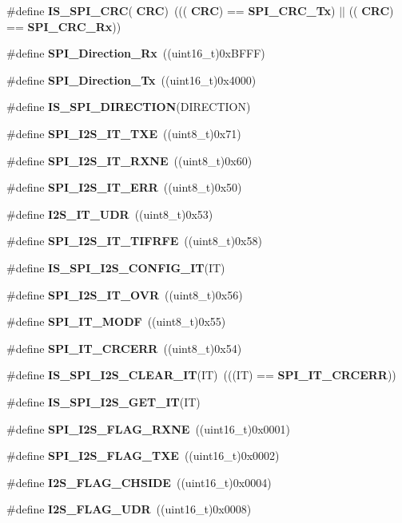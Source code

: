 \begin{DoxyCompactItemize}
\#define \textbf{ I\+S\+\_\+\+S\+P\+I\+\_\+\+C\+RC}(\textbf{ C\+RC})~(((\textbf{ C\+RC}) == \textbf{ S\+P\+I\+\_\+\+C\+R\+C\+\_\+\+Tx}) $\vert$$\vert$ ((\textbf{ C\+RC}) == \textbf{ S\+P\+I\+\_\+\+C\+R\+C\+\_\+\+Rx}))
\item 
\#define \textbf{ S\+P\+I\+\_\+\+Direction\+\_\+\+Rx}~((uint16\+\_\+t)0x\+B\+F\+F\+F)
\item 
\#define \textbf{ S\+P\+I\+\_\+\+Direction\+\_\+\+Tx}~((uint16\+\_\+t)0x4000)
\item 
\#define \textbf{ I\+S\+\_\+\+S\+P\+I\+\_\+\+D\+I\+R\+E\+C\+T\+I\+ON}(D\+I\+R\+E\+C\+T\+I\+ON)
\item 
\#define \textbf{ S\+P\+I\+\_\+\+I2\+S\+\_\+\+I\+T\+\_\+\+T\+XE}~((uint8\+\_\+t)0x71)
\item 
\#define \textbf{ S\+P\+I\+\_\+\+I2\+S\+\_\+\+I\+T\+\_\+\+R\+X\+NE}~((uint8\+\_\+t)0x60)
\item 
\#define \textbf{ S\+P\+I\+\_\+\+I2\+S\+\_\+\+I\+T\+\_\+\+E\+RR}~((uint8\+\_\+t)0x50)
\item 
\#define \textbf{ I2\+S\+\_\+\+I\+T\+\_\+\+U\+DR}~((uint8\+\_\+t)0x53)
\item 
\#define \textbf{ S\+P\+I\+\_\+\+I2\+S\+\_\+\+I\+T\+\_\+\+T\+I\+F\+R\+FE}~((uint8\+\_\+t)0x58)
\item 
\#define \textbf{ I\+S\+\_\+\+S\+P\+I\+\_\+\+I2\+S\+\_\+\+C\+O\+N\+F\+I\+G\+\_\+\+IT}(IT)
\item 
\#define \textbf{ S\+P\+I\+\_\+\+I2\+S\+\_\+\+I\+T\+\_\+\+O\+VR}~((uint8\+\_\+t)0x56)
\item 
\#define \textbf{ S\+P\+I\+\_\+\+I\+T\+\_\+\+M\+O\+DF}~((uint8\+\_\+t)0x55)
\item 
\#define \textbf{ S\+P\+I\+\_\+\+I\+T\+\_\+\+C\+R\+C\+E\+RR}~((uint8\+\_\+t)0x54)
\item 
\#define \textbf{ I\+S\+\_\+\+S\+P\+I\+\_\+\+I2\+S\+\_\+\+C\+L\+E\+A\+R\+\_\+\+IT}(IT)~(((IT) == \textbf{ S\+P\+I\+\_\+\+I\+T\+\_\+\+C\+R\+C\+E\+RR}))
\item 
\#define \textbf{ I\+S\+\_\+\+S\+P\+I\+\_\+\+I2\+S\+\_\+\+G\+E\+T\+\_\+\+IT}(IT)
\item 
\#define \textbf{ S\+P\+I\+\_\+\+I2\+S\+\_\+\+F\+L\+A\+G\+\_\+\+R\+X\+NE}~((uint16\+\_\+t)0x0001)
\item 
\#define \textbf{ S\+P\+I\+\_\+\+I2\+S\+\_\+\+F\+L\+A\+G\+\_\+\+T\+XE}~((uint16\+\_\+t)0x0002)
\item 
\#define \textbf{ I2\+S\+\_\+\+F\+L\+A\+G\+\_\+\+C\+H\+S\+I\+DE}~((uint16\+\_\+t)0x0004)
\item 
\#define \textbf{ I2\+S\+\_\+\+F\+L\+A\+G\+\_\+\+U\+DR}~((uint16\+\_\+t)0x0008)
$$
\end{DoxyCompactItemize}
